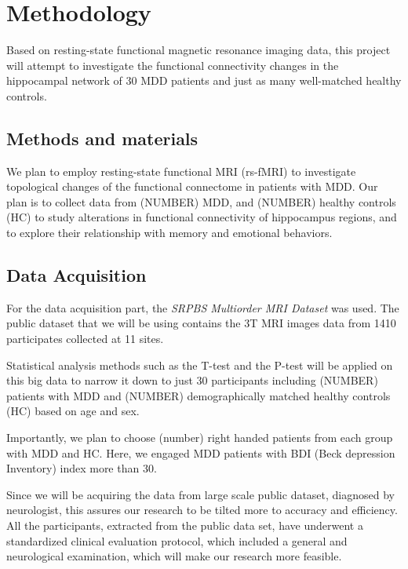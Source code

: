 \documentclass{article}
\begin{document}
\newpage

\section{Methodology}

Based on resting-state functional magnetic resonance imaging data,
this project will attempt to investigate the functional connectivity
changes in the hippocampal network of 30 MDD patients and just as many
well-matched healthy controls.

\subsection{Methods and materials}

We plan to employ resting-state functional MRI (rs-fMRI) to
investigate topological changes of the functional connectome in
patients with MDD. Our plan is to collect data from (NUMBER) MDD, and
(NUMBER) healthy controls (HC) to study alterations in functional
connectivity of hippocampus regions, and to explore their relationship
with memory and emotional behaviors.

\subsection{Data Acquisition}

For the data acquisition part, the \textit{SRPBS Multiorder MRI
Dataset} was used. The public dataset that we will be using contains
the 3T MRI images data from 1410 participates collected at 11 sites.

Statistical analysis methods such as the T-test and the P-test will be
applied on this big data to narrow it down to just 30 participants
including (NUMBER) patients with MDD and (NUMBER) demographically
matched healthy controls (HC) based on age and sex.

Importantly, we plan to choose (number) right handed patients from
each group with MDD and HC. Here, we engaged MDD patients with BDI
(Beck depression Inventory) index more than 30.

Since we will be acquiring the data from large scale public dataset,
diagnosed by neurologist, this assures our research to be tilted more
to accuracy and efficiency. All the participants, extracted from the
public data set, have underwent a standardized clinical evaluation
protocol, which included a general and neurological examination, which
will make our research more feasible.
\end{document}
